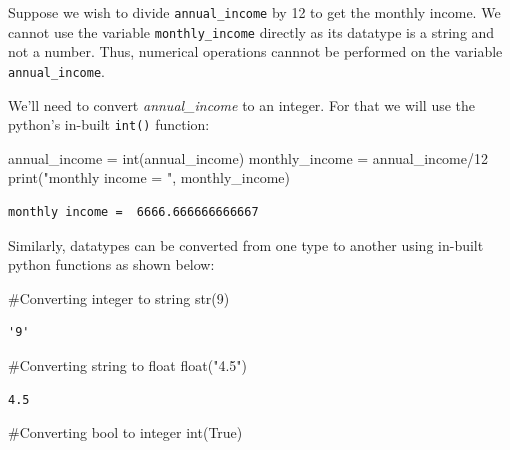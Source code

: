\documentclass[
  letterpaper,
  DIV=11,
  numbers=noendperiod]{scrreprt}
\newenvironment{Shaded}{\begin{snugshade}}{\end{snugshade}}
\newcommand{\BuiltInTok}[1]{\textcolor[rgb]{0.00,0.23,0.31}{#1}}
\newcommand{\CommentTok}[1]{\textcolor[rgb]{0.37,0.37,0.37}{#1}}
\newcommand{\DecValTok}[1]{\textcolor[rgb]{0.68,0.00,0.00}{#1}}
\newcommand{\NormalTok}[1]{\textcolor[rgb]{0.00,0.23,0.31}{#1}}
\newcommand{\OperatorTok}[1]{\textcolor[rgb]{0.37,0.37,0.37}{#1}}
\newcommand{\StringTok}[1]{\textcolor[rgb]{0.13,0.47,0.30}{#1}}
\newcommand{\VariableTok}[1]{\textcolor[rgb]{0.07,0.07,0.07}{#1}}
\begin{document}
Suppose we wish to divide \texttt{annual\_income} by 12 to get the
monthly income. We cannot use the variable \texttt{monthly\_income}
directly as its datatype is a string and not a number. Thus, numerical
operations cannnot be performed on the variable \texttt{annual\_income}.

We'll need to convert \emph{annual\_income} to an integer. For that we
will use the python's in-built \texttt{int()} function:

\begin{Shaded}
\begin{Highlighting}[]
\NormalTok{annual\_income }\OperatorTok{=} \BuiltInTok{int}\NormalTok{(annual\_income)}
\NormalTok{monthly\_income }\OperatorTok{=}\NormalTok{ annual\_income}\OperatorTok{/}\DecValTok{12}
\BuiltInTok{print}\NormalTok{(}\StringTok{"monthly income = "}\NormalTok{, monthly\_income)}
\end{Highlighting}
\end{Shaded}

\begin{verbatim}
monthly income =  6666.666666666667
\end{verbatim}

Similarly, datatypes can be converted from one type to another using
in-built python functions as shown below:

\begin{Shaded}
\begin{Highlighting}[]
\CommentTok{\#Converting integer to string}
\BuiltInTok{str}\NormalTok{(}\DecValTok{9}\NormalTok{)}
\end{Highlighting}
\end{Shaded}

\begin{verbatim}
'9'
\end{verbatim}

\begin{Shaded}
\begin{Highlighting}[]
\CommentTok{\#Converting string to float}
\BuiltInTok{float}\NormalTok{(}\StringTok{"4.5"}\NormalTok{)}
\end{Highlighting}
\end{Shaded}

\begin{verbatim}
4.5
\end{verbatim}

\begin{Shaded}
\begin{Highlighting}[]
\CommentTok{\#Converting bool to integer}
\BuiltInTok{int}\NormalTok{(}\VariableTok{True}\NormalTok{)}
\end{Highlighting}
\end{Shaded}
\end{document}
